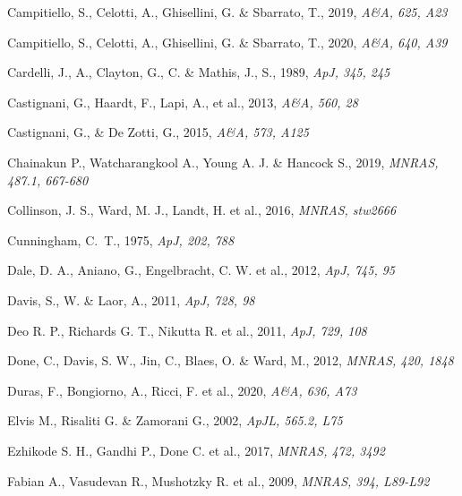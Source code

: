 \documentclass[]{aa}
\begin{document}
\begin{thebibliography}{}
Campitiello, S., Celotti, A., Ghisellini, G. \& Sbarrato, T., 2019,
\newblock \emph{A\&A, 625, A23}

Campitiello, S., Celotti, A., Ghisellini, G. \& Sbarrato, T., 2020,
\newblock \emph{A\&A, 640, A39}

Cardelli, J., A., Clayton, G., C. \& Mathis, J., S., 1989,
\newblock \emph{ApJ, 345, 245}

Castignani, G., Haardt, F., Lapi, A., et al., 2013,
\newblock \emph{A\&A, 560, 28}

Castignani, G., \& De Zotti, G., 2015,
\newblock \emph{A\&A, 573, A125}

Chainakun P., Watcharangkool A., Young A. J. \& Hancock S., 2019,
\newblock \emph{MNRAS, 487.1, 667-680}

Collinson, J. S., Ward, M. J., Landt, H. et al., 2016,
\newblock \emph{MNRAS, stw2666}

Cunningham, C.~T., 1975,
\newblock \emph{ApJ, 202, 788}

Dale, D. A., Aniano, G., Engelbracht, C. W. et al., 2012,
\newblock \emph{ApJ, 745, 95} 

Davis, S., W. \& Laor, A., 2011,
\newblock \emph{ApJ, 728, 98}

Deo R. P., Richards G. T., Nikutta R. et al., 2011,
\newblock \emph{ApJ, 729, 108}

Done, C., Davis, S. W., Jin, C., Blaes, O. \& Ward, M., 2012,
\newblock \emph{MNRAS, 420, 1848}

Duras, F., Bongiorno, A., Ricci, F. et al., 2020,
\newblock \emph{A\&A, 636, A73}

Elvis M., Risaliti G. \& Zamorani G., 2002,
\newblock \emph{ApJL, 565.2, L75}

Ezhikode S. H., Gandhi P., Done C. et al., 2017,
\newblock \emph{MNRAS, 472, 3492}

Fabian A., Vasudevan R., Mushotzky R. et al., 2009,
\newblock \emph{MNRAS, 394, L89-L92}


\end{thebibliography}
\end{document}
